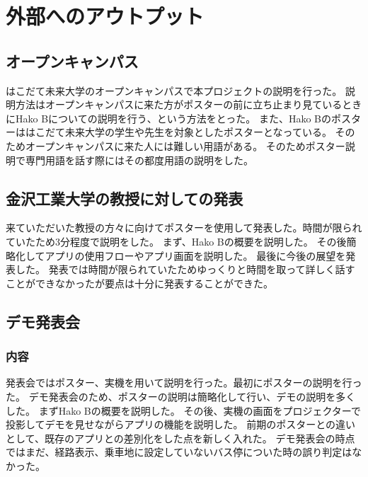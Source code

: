 \documentclass[openany,11pt,papersize]{jsbook}
\begin{document}


\chapter{外部へのアウトプット}
\section{オープンキャンパス}
はこだて未来大学のオープンキャンパスで本プロジェクトの説明を行った。
説明方法はオープンキャンパスに来た方がポスターの前に立ち止まり見ているときにHako Bについての説明を行う、という方法をとった。
また、Hako Bのポスターははこだて未来大学の学生や先生を対象としたポスターとなっている。
そのためオープンキャンパスに来た人には難しい用語がある。
そのためポスター説明で専門用語を話す際にはその都度用語の説明をした。


\section{金沢工業大学の教授に対しての発表}
来ていただいた教授の方々に向けてポスターを使用して発表した。時間が限られていたため3分程度で説明をした。
まず、Hako Bの概要を説明した。
その後簡略化してアプリの使用フローやアプリ画面を説明した。
最後に今後の展望を発表した。
発表では時間が限られていたためゆっくりと時間を取って詳しく話すことができなかったが要点は十分に発表することができた。


\section{デモ発表会}
\subsection{内容}
発表会ではポスター、実機を用いて説明を行った。最初にポスターの説明を行った。
デモ発表会のため、ポスターの説明は簡略化して行い、デモの説明を多くした。
まずHako Bの概要を説明した。
その後、実機の画面をプロジェクターで投影してデモを見せながらアプリの機能を説明した。
前期のポスターとの違いとして、既存のアプリとの差別化をした点を新しく入れた。
デモ発表会の時点ではまだ、経路表示、乗車地に設定していないバス停についた時の誤り判定はなかった。
\end{document}
